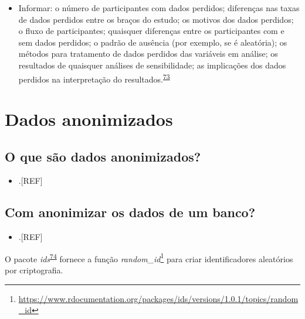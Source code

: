 \documentclass[
  a4paper,
]{book}
\providecommand{\tightlist}{%
  \setlength{\itemsep}{0pt}\setlength{\parskip}{0pt}}
\renewcommand{\href}[2]{#2\footnote{\url{#1}}}
\newenvironment{infobox}[1]
  {
  \begin{itemize}
  \renewcommand{\labelitemi}{
    \raisebox{-.7\height}[0pt][0pt]{
      {\setkeys{Gin}{width=3em,keepaspectratio}
        \texttt{[image: \#1]}}
    }
  }
  \setlength{\fboxsep}{1em}
  \begin{blackbox}
  \item
  }
  {
  \end{blackbox}
  \end{itemize}
  }
\begin{document}
\begin{itemize}
\tightlist
\item
  Informar: o número de participantes com dados perdidos; diferenças nas taxas de dados perdidos entre os braços do estudo; os motivos dos dados perdidos; o fluxo de participantes; quaisquer diferenças entre os participantes com e sem dados perdidos; o padrão de ausência (por exemplo, se é aleatória); os métodos para tratamento de dados perdidos das variáveis em análise; os resultados de quaisquer análises de sensibilidade; as implicações dos dados perdidos na interpretação do resultados.\textsuperscript{\protect\hyperlink{ref-Akl2015}{73}}
\end{itemize}

\hypertarget{dados-anonimizados}{%
\section{Dados anonimizados}\label{dados-anonimizados}}

\hypertarget{o-que-suxe3o-dados-anonimizados}{%
\subsection{O que são dados anonimizados?}\label{o-que-suxe3o-dados-anonimizados}}

\begin{itemize}
\tightlist
\item
  .{[}REF{]}
\end{itemize}

\hypertarget{com-anonimizar-os-dados-de-um-banco}{%
\subsection{Com anonimizar os dados de um banco?}\label{com-anonimizar-os-dados-de-um-banco}}

\begin{itemize}
\tightlist
\item
  .{[}REF{]}
\end{itemize}

\begin{infobox}{images/Rlogo}
O pacote \emph{ids}\textsuperscript{\protect\hyperlink{ref-ids}{74}} fornece a função \href{https://www.rdocumentation.org/packages/ids/versions/1.0.1/topics/random_id}{\emph{random\_id}} para criar identificadores aleatórios por criptografia.

\end{infobox}
\end{document}
